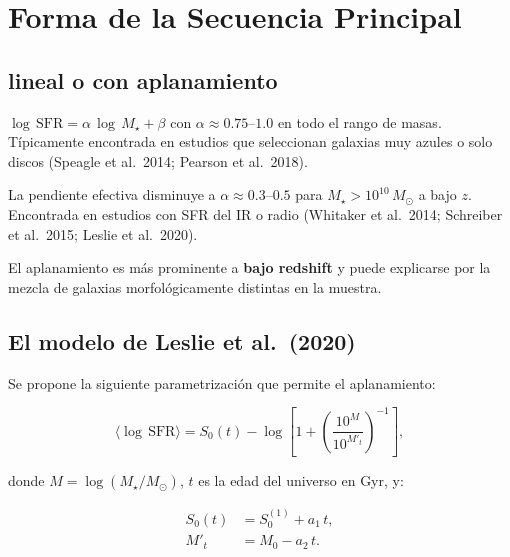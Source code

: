 \documentclass[12pt, a4paper]{article}
\begin{document}
\section{Forma de la Secuencia Principal}

\subsection{lineal o con aplanamiento}

\begin{description}[leftmargin=2em]
    \item[\textcolor{azulms}{Relación lineal}]
        $\log\,\mathrm{SFR} = \alpha\,\log\,M_\star + \beta$ con $\alpha \approx 0.75$--$1.0$
        en todo el rango de masas. Típicamente encontrada en estudios que seleccionan
        galaxias muy azules o solo discos (Speagle et al.\ 2014; Pearson et al.\ 2018).

    \item[\textcolor{rojoquench}{Relación con aplanamiento}]
        La pendiente efectiva disminuye a $\alpha \approx 0.3$--$0.5$ para
        $M_\star > 10^{10}\,M_\odot$ a bajo $z$. Encontrada en estudios con SFR
        del IR o radio (Whitaker et al.\ 2014; Schreiber et al.\ 2015;
        Leslie et al.\ 2020).
\end{description}

El aplanamiento es más prominente a \textbf{bajo redshift} y puede explicarse
por la mezcla de galaxias morfológicamente distintas en la muestra.

\subsection{El modelo de Leslie et al.\ (2020)}

Se propone la siguiente parametrización que permite el aplanamiento:

\begin{equation}
    \langle\log\,\mathrm{SFR}\rangle =
    S_0(t) - \log\!\left[1 + \left(\frac{10^M}{10^{M'_t}}\right)^{-1}\right],
    \label{eq:ms_leslie}
\end{equation}

donde $M = \log(M_\star/M_\odot)$, $t$ es la edad del universo en Gyr, y:

\begin{align}
    S_0(t) &= S_0^{(1)} + a_1\,t, \label{eq:s0}\\
    M'_t   &= M_0 - a_2\,t.       \label{eq:mt}
\end{align}
\end{document}
